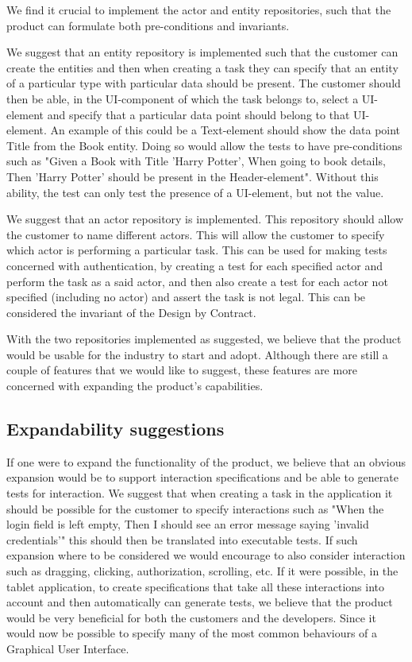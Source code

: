 We find it crucial to implement the actor and entity repositories, such that the product can formulate both pre-conditions and invariants.

We suggest that an entity repository is implemented such that the customer can create the entities and then when creating a task they can specify that an entity of a particular type with particular data should be present.
The customer should then be able, in the UI-component of which the task belongs to, select a UI-element and specify that a particular data point should belong to that UI-element.
An example of this could be a Text-element should show the data point Title from the Book entity.
Doing so would allow the tests to have pre-conditions such as "Given a Book with Title 'Harry Potter', When going to book details, Then 'Harry Potter' should be present in the Header-element".
Without this ability, the test can only test the presence of a UI-element, but not the value.

We suggest that an actor repository is implemented.
This repository should allow the customer to name different actors.
This will allow the customer to specify which actor is performing a particular task.
This can be used for making tests concerned with authentication, by creating a test for each specified actor and perform the task as a said actor, and then also create a test for each actor not specified (including no actor) and assert the task is not legal.
This can be considered the invariant of the Design by Contract.

With the two repositories implemented as suggested, we believe that the product would be usable for the industry to start and adopt.
Although there are still a couple of features that we would like to suggest, these features are more concerned with expanding the product's capabilities.

\subsection{Expandability suggestions}
If one were to expand the functionality of the product, we believe that an obvious expansion would be to support interaction specifications and be able to generate tests for interaction.
We suggest that when creating a task in the application it should be possible for the customer to specify interactions such as "When the login field is left empty, Then I should see an error message saying 'invalid credentials'" this should then be translated into executable tests. 
If such expansion where to be considered we would encourage to also consider interaction such as dragging, clicking, authorization, scrolling, etc.
If it were possible, in the tablet application, to create specifications that take all these interactions into account and then automatically can generate tests, we believe that the product would be very beneficial for both the customers and the developers.
Since it would now be possible to specify many of the most common behaviours of a Graphical User Interface.

